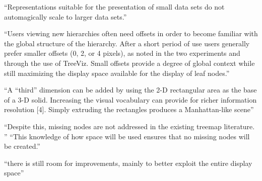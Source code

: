 \enquote{Representations suitable for the presentation of small data sets do not automagically scale to larger data sets.}\cite[161]{johnson1993treemapsPhd}

\enquote{Users viewing new hierarchies often need offsets in order to become familiar with the global structure of the hierarchy. After a short period of use users generally prefer smaller offsets (0, 2, or 4 pixels), as noted in the two experiments and through the use of TreeViz. Small offsets provide a degree of global context while still maximizing the display space available for the display of leaf nodes.}\cite[3]{johnson1992improving}

\enquote{A “third” dimension can be added by using the 2-D rectangular area as the base of a 3-D solid. Increasing the visual vocabulary can provide for richer information resolution [4]. Simply extruding the rectangles produces a Manhattan-like scene}\cite[5]{johnson1992improving}

\enquote{Despite this, missing nodes are not addressed in the existing treemap literature. }\cite[5]{lu2008cascaded}
\enquote{This knowledge of how space will be used ensures that no missing nodes will be created.}\cite[6]{lu2008cascaded}

\enquote{there is still room for improvements, mainly to better exploit the entire display space}\cite[8]{visbasedlarge}